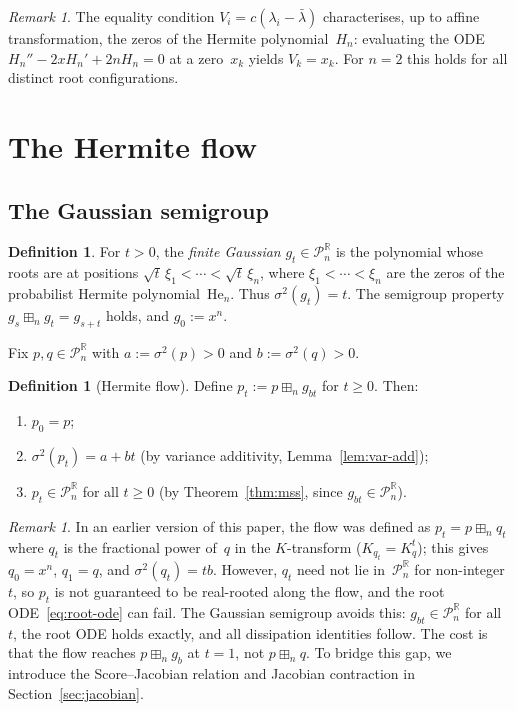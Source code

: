 \documentclass[11pt,a4paper]{amsart}
\theoremstyle{plain}
\theoremstyle{definition}
\newtheorem{definition}[theorem]{Definition}
\theoremstyle{remark}
\newtheorem{remark}[theorem]{Remark}
\newcommand{\R}{\mathbb{R}}
\newcommand{\PnR}[1][n]{\mathcal{P}^{\R}_{#1}}
\newcommand{\fp}{\boxplus_n}
\begin{document}
\begin{remark}\label{rem:hermite}
The equality condition $V_i=c(\lambda_i-\bar\lambda)$
characterises, up to affine transformation, the zeros of
the Hermite polynomial~$H_n$: evaluating the ODE
$H_n''-2xH_n'+2nH_n=0$ at a zero~$x_k$ yields $V_k=x_k$.
For $n=2$ this holds for all distinct root configurations.
\end{remark}


\section{The Hermite flow}
\label{sec:flow}

\subsection{The Gaussian semigroup}

\begin{definition}\label{def:gaussian}
For $t>0$, the \emph{finite Gaussian} $g_t\in\PnR$ is the
polynomial whose roots are at positions
$\sqrt{t}\,\xi_1<\cdots<\sqrt{t}\,\xi_n$, where
$\xi_1<\cdots<\xi_n$ are the zeros of the probabilist
Hermite polynomial~$\mathrm{He}_n$.
Thus $\sigma^2(g_t)=t$.
The semigroup property $g_s\fp g_t=g_{s+t}$ holds, and
$g_0:=x^n$.
\end{definition}

Fix $p,q\in\PnR$ with $a:=\sigma^2(p)>0$ and
$b:=\sigma^2(q)>0$.

\begin{definition}[Hermite flow]\label{def:flow}
Define $p_t:=p\fp g_{bt}$ for $t\ge 0$.
Then:
\begin{enumerate}[label=\textup{(\alph*)},nosep]
\item $p_0=p$;
\item $\sigma^2(p_t)=a+bt$ (by variance additivity,
  Lemma~\ref{lem:var-add});
\item $p_t\in\PnR$ for all $t\ge 0$
  (by Theorem~\ref{thm:mss}, since $g_{bt}\in\PnR$).
\end{enumerate}
\end{definition}

\begin{remark}\label{rem:why-gaussian}
In an earlier version of this paper, the flow was defined
as $p_t=p\fp q_t$ where $q_t$ is the fractional power
of~$q$ in the $K$-transform ($K_{q_t}=K_q^t$);
this gives $q_0=x^n$, $q_1=q$, and $\sigma^2(q_t)=tb$.
However, $q_t$ need not lie in~$\PnR$ for non-integer~$t$,
so $p_t$ is not guaranteed to be real-rooted along the flow,
and the root ODE~\eqref{eq:root-ode} can fail.
The Gaussian semigroup avoids this: $g_{bt}\in\PnR$
for all~$t$, the root ODE holds exactly, and
all dissipation identities follow.
The cost is that the flow reaches $p\fp g_b$ at $t=1$,
not $p\fp q$.
To bridge this gap, we introduce the
Score--Jacobian relation and Jacobian contraction
in Section~\ref{sec:jacobian}.
\end{remark}
\end{document}
